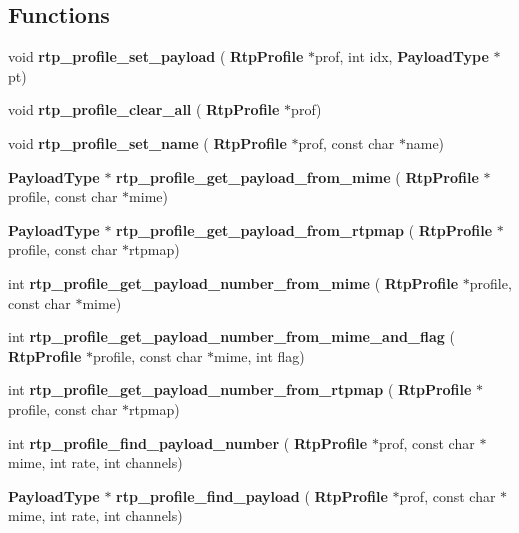 \subsection*{Functions}
\begin{DoxyCompactItemize}
\item 
void \textbf{ rtp\+\_\+profile\+\_\+set\+\_\+payload} (\textbf{ Rtp\+Profile} $\ast$prof, int idx, \textbf{ Payload\+Type} $\ast$pt)
\item 
void \textbf{ rtp\+\_\+profile\+\_\+clear\+\_\+all} (\textbf{ Rtp\+Profile} $\ast$prof)
\item 
void \textbf{ rtp\+\_\+profile\+\_\+set\+\_\+name} (\textbf{ Rtp\+Profile} $\ast$prof, const char $\ast$name)
\item 
\mbox{\label{rtpprofile_8h_a72610e4bcbef2461ec6b345df849bbd4}} 
\textbf{ Payload\+Type} $\ast$ {\bfseries rtp\+\_\+profile\+\_\+get\+\_\+payload\+\_\+from\+\_\+mime} (\textbf{ Rtp\+Profile} $\ast$profile, const char $\ast$mime)
\item 
\mbox{\label{rtpprofile_8h_a50852a8808443984c0272133cc7b5f60}} 
\textbf{ Payload\+Type} $\ast$ {\bfseries rtp\+\_\+profile\+\_\+get\+\_\+payload\+\_\+from\+\_\+rtpmap} (\textbf{ Rtp\+Profile} $\ast$profile, const char $\ast$rtpmap)
\item 
\mbox{\label{rtpprofile_8h_ac61f0ada65640e3dca648942edb02c6b}} 
int {\bfseries rtp\+\_\+profile\+\_\+get\+\_\+payload\+\_\+number\+\_\+from\+\_\+mime} (\textbf{ Rtp\+Profile} $\ast$profile, const char $\ast$mime)
\item 
\mbox{\label{rtpprofile_8h_a6aa92f8f9bd5934ca599c6460d28541e}} 
int {\bfseries rtp\+\_\+profile\+\_\+get\+\_\+payload\+\_\+number\+\_\+from\+\_\+mime\+\_\+and\+\_\+flag} (\textbf{ Rtp\+Profile} $\ast$profile, const char $\ast$mime, int flag)
\item 
\mbox{\label{rtpprofile_8h_a2a67a5886e323b3041c4c637549a98b2}} 
int {\bfseries rtp\+\_\+profile\+\_\+get\+\_\+payload\+\_\+number\+\_\+from\+\_\+rtpmap} (\textbf{ Rtp\+Profile} $\ast$profile, const char $\ast$rtpmap)
\item 
\mbox{\label{rtpprofile_8h_a5ed55b41abba4947132dd504307b4859}} 
int {\bfseries rtp\+\_\+profile\+\_\+find\+\_\+payload\+\_\+number} (\textbf{ Rtp\+Profile} $\ast$prof, const char $\ast$mime, int rate, int channels)
\item 
\mbox{\label{rtpprofile_8h_a80784376ff73cd052183b4ba1ed6896f}} 
\textbf{ Payload\+Type} $\ast$ {\bfseries rtp\+\_\+profile\+\_\+find\+\_\+payload} (\textbf{ Rtp\+Profile} $\ast$prof, const char $\ast$mime, int rate, int channels)

\end{DoxyCompactItemize}

